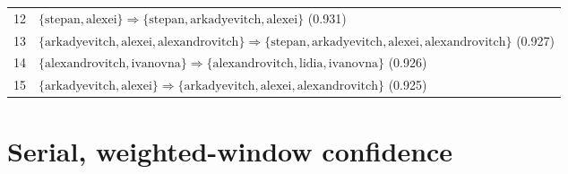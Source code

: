 \begin{appendices}
\begin{longtable}{p{20pt}|p{\dimexpr\textwidth-20pt-\tabcolsep\relax}}
12 & $ \{ \text{stepan},\allowbreak\text{alexei} \} \Rightarrow \{ \text{stepan},\allowbreak\text{arkadyevitch},\allowbreak\text{alexei} \} $ (0.931) \\
13 & $ \{ \text{arkadyevitch},\allowbreak\text{alexei},\allowbreak\text{alexandrovitch} \} \Rightarrow \{ \text{stepan},\allowbreak\text{arkadyevitch},\allowbreak\text{alexei},\allowbreak\text{alexandrovitch} \} $ (0.927) \\
14 & $ \{ \text{alexandrovitch},\allowbreak\text{ivanovna} \} \Rightarrow \{ \text{alexandrovitch},\allowbreak\text{lidia},\allowbreak\text{ivanovna} \} $ (0.926) \\
15 & $ \{ \text{arkadyevitch},\allowbreak\text{alexei} \} \Rightarrow \{ \text{arkadyevitch},\allowbreak\text{alexei},\allowbreak\text{alexandrovitch} \} $ (0.925) \\
\end{longtable}

\section{Serial, weighted-window confidence}


\end{appendices}

